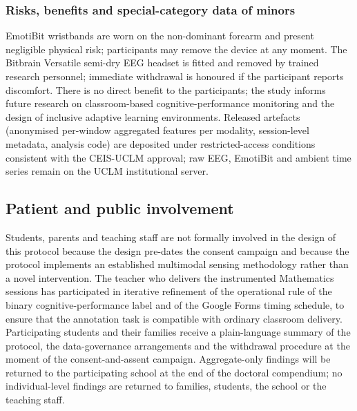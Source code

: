 \subsubsection{Risks, benefits and special-category data of minors}

EmotiBit wristbands are worn on the non-dominant forearm and present negligible physical risk; participants may remove the device at any moment. The Bitbrain Versatile semi-dry EEG headset is fitted and removed by trained research personnel; immediate withdrawal is honoured if the participant reports discomfort. There is no direct benefit to the participants; the study informs future research on classroom-based cognitive-performance monitoring and the design of inclusive adaptive learning environments. Released artefacts (anonymised per-window aggregated features per modality, session-level metadata, analysis code) are deposited under restricted-access conditions consistent with the CEIS-UCLM approval; raw EEG, EmotiBit and ambient time series remain on the UCLM institutional server.

\subsection{Patient and public involvement}\label{subsec:ppi}

Students, parents and teaching staff are not formally involved in the design of this protocol because the design pre-dates the consent campaign and because the protocol implements an established multimodal sensing methodology rather than a novel intervention. The teacher who delivers the instrumented Mathematics sessions has participated in iterative refinement of the operational rule of the binary cognitive-performance label and of the Google Forms timing schedule, to ensure that the annotation task is compatible with ordinary classroom delivery. Participating students and their families receive a plain-language summary of the protocol, the data-governance arrangements and the withdrawal procedure at the moment of the consent-and-assent campaign. Aggregate-only findings will be returned to the participating school at the end of the doctoral compendium; no individual-level findings are returned to families, students, the school or the teaching staff.
